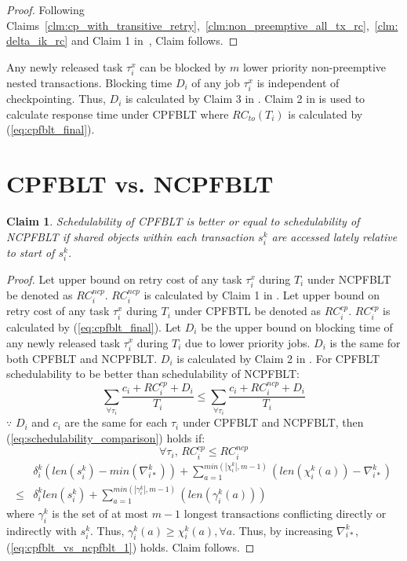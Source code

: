 \documentclass[conference]{IEEEtran}
\newtheorem{clm}{Claim}
\begin{document}
%
\begin{proof}
%
Following Claims~\ref{clm:cp_with_transitive_retry},~\ref{clm:non_preemptive_all_tx_rc},~\ref{clm:delta_ik_rc}  and Claim 1 in~\cite{fblt}, Claim follows.
%
\end{proof}
%
Any newly released task $\tau_{i}^{x}$ can be blocked by $m$ lower priority non-preemptive nested transactions. Blocking time $D_{i}$ of any job $\tau_i^x$ is independent of checkpointing. Thus, $D_i$ is calculated by Claim 3 in \cite{fblt}. Claim 2 in \cite{fblt} is used to calculate response time under CPFBLT where $RC_{to}(T_{i})$ is calculated by (\ref{eq:cpfblt_final}).
%
\section{CPFBLT vs. NCPFBLT}\label{sec:schedulabiltiy comparison}

\begin{clm}\label{clm:cp_ncp_fblt_schedulabiltiy_comp}
%
Schedulability of CPFBLT is better or equal to schedulability of NCPFBLT if shared objects within each transaction $s_i^k$ are accessed lately relative to start of $s_i^k$.
%
\end{clm}
%
\begin{proof}
%
Let upper bound on retry cost of any task $\tau_{i}^{x}$ during $T_{i}$ under NCPFBLT be denoted as $RC_{i}^{ncp}$. $RC_{i}^{ncp}$ is calculated by Claim 1 in \cite{fblt}. Let upper bound on retry cost of any task $\tau_{i}^{x}$ during $T_{i}$ under CPFBTL be denoted as $RC_{i}^{cp}$. $RC_{i}^{cp}$ is calculated by (\ref{eq:cpfblt_final}). Let $D_{i}$ be the upper bound on blocking time of any newly released task $\tau_{i}^{x}$ during $T_{i}$ due to lower priority jobs. $D_{i}$ is the same for both CPFBLT and NCPFBLT. $D_{i}$ is calculated by Claim 2 in \cite{fblt}. For CPFBLT schedulability to be better than schedulability of NCPFBLT: 
%
\begin{equation}
\sum_{\forall\tau_{i}}\frac{c_{i}+RC_{i}^{cp}+D_{i}}{T_{i}}\le\sum_{\forall\tau_{i}}\frac{c_{i}+RC_{i}^{ncp}+D_{i}}{T_{i}}\label{eq:schedulability_comparison}
\end{equation}
$\because$ $D_{i}$ and $c_{i}$ are the same for each $\tau_{i}$
under CPFBLT and NCPFBLT, then (\ref{eq:schedulability_comparison})
holds if:
\[
\forall\tau_{i},\, RC_{i}^{cp}\le RC_{i}^{ncp}
\]
%
\begin{eqnarray}
 & \delta_{i}^{k}\left(len\left(s_{i}^{k}\right)-min\left(\nabla_{i*}^{k}\right)\right)+\sum_{a=1}^{min\left(|\chi_{i}^{k}|,m-1\right)}\left(len\left(\chi_{i}^{k}(a)\right)-\nabla_{i*}^{k}\right)\nonumber\\
\le & \delta_{i}^{k}len\left(s_{i}^{k}\right)+\sum_{a=1}^{min\left(|\gamma_{i}^{k}|,m-1\right)}\left(len\left(\gamma_{i}^{k}(a)\right)\right)
\label{eq:cpfblt_vs_ncpfblt_1}
\end{eqnarray}
%
where $\gamma_i^k$ is the set of at most $m-1$ longest transactions conflicting directly or indirectly with $s_i^k$. Thus, $\gamma_i^k(a) \ge \chi_i^k(a), \forall a$. Thus, by increasing $\nabla_{i*}^k$, (\ref{eq:cpfblt_vs_ncpfblt_1}) holds. Claim follows.
%
\end{proof}
%
\end{document}
